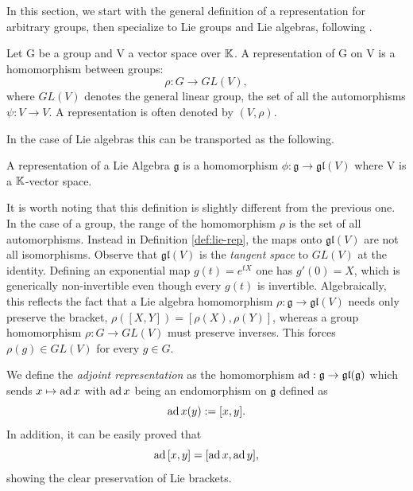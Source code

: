 In this section, we start with the general definition of a representation for arbitrary groups, then specialize to Lie groups and Lie algebras, following \cite{hallLieGroupsLie2003}.

\begin{definition}\label{def:group-rep}
	Let G be a group and V a vector space over $\mathbb{K}$. A representation of G on V is a homomorphism between groups:
	\[
		\rho : G \to GL(V),
	\]
	where $GL(V)$ denotes the general linear group, the set of all the automorphisms $\psi: V \to V$. A representation is often denoted by $(V, \rho)$.
\end{definition}


\noindent In the case of Lie algebras this can be transported as the following.

\begin{definition}\label{def:lie-rep}
	A representation of a Lie Algebra $\mathfrak{g}$ is a homomorphism $\phi: \mathfrak{g} \to \mathfrak{gl}(V)$ where V is a $\mathbb{K}$-vector space.
\end{definition}

\begin{remark}
	It is worth noting that this definition is slightly different from the previous one. In the case of a group, the range of the homomorphism $\rho$ is the set of all automorphisms. Instead in Definition \autoref{def:lie-rep}, the maps onto $\mathfrak{gl}(V)$ are not all isomorphisms. Observe that $\mathfrak{gl}(V)$ is the \emph{tangent space} to $GL(V)$ at the identity.  Defining an exponential map $g(t) = e^{tX}$ one has $g'(0) = X$, which is generically non-invertible even though every $g(t)$ is invertible. Algebraically, this reflects the fact that a Lie algebra homomorphism $\rho : \mathfrak{g} \to \mathfrak{gl}(V)$ needs only preserve the bracket, $\rho([X,Y]) = [\rho(X),\rho(Y)]$, whereas a group homomorphism $\rho : G \to GL(V)$ must preserve inverses. This forces $\rho(g) \in GL(V)$ for every $g \in G$.
\end{remark}

\begin{example}
	We define the \textit{adjoint representation} as the homomorphism $\operatorname{ad}: \mathfrak{g} \to \mathfrak{gl}(\mathfrak{g})$ which sends $x \mapsto \operatorname{ad}{x}$ with $\operatorname{ad}{x}$ being an endomorphism on $\mathfrak{g}$ defined as \[ \operatorname{ad}{x}(y) := [x,y].\]
	In addition, it can be easily proved that \[
		\operatorname{ad}{[x,y]} = [\operatorname{ad}{x},\operatorname{ad}{y}],
	\]
	showing the clear preservation of Lie brackets.
\end{example}

